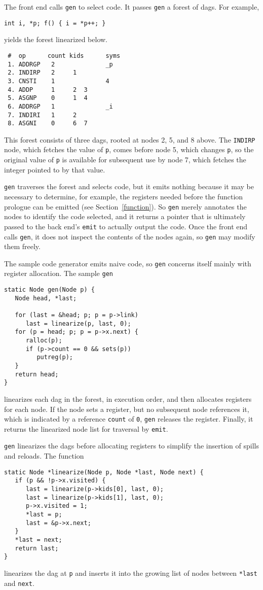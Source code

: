 \label{gen}
\label{dags:registers}
The front end calls \verb|gen| to select code.  It passes \verb|gen| a
forest of dags.  For example,
\begin{verbatim}
int i, *p; f() { i = *p++; }
\end{verbatim}
yields the forest linearized below.
\begin{verbatim}
 #  op      count kids      syms
 1. ADDRGP   2              _p
 2. INDIRP   2     1
 3. CNSTI    1              4
 4. ADDP     1     2  3
 5. ASGNP    0     1  4
 6. ADDRGP   1              _i
 7. INDIRI   1     2
 8. ASGNI    0     6  7
\end{verbatim}
This forest consists of three dags, rooted at nodes 2, 5, and 8 above.
The \verb|INDIRP| node, which fetches the value of \verb|p|, comes
before node 5, which changes \verb|p|, so the original value of
\verb|p| is available for subsequent use by node 7, which fetches the
integer pointed to by that value.

\verb|gen| traverses the forest and selects code, but it
emits nothing because it may be necessary to determine, for example,
the registers needed before the function prologue
can be emitted (see Section~\ref{function}).
So \verb|gen| merely annotates the nodes to identify the code selected,
and it returns a pointer that is ultimately passed to the back end's
\verb|emit| to actually output the code.  Once the front end calls
\verb|gen|, it does not inspect the contents of the nodes again, so
\verb|gen| may modify them freely.

The sample code generator emits naive code, so \verb|gen| concerns
itself mainly with register allocation. 
The sample \verb|gen|
\begin{verbatim}
static Node gen(Node p) {
   Node head, *last;

   for (last = &head; p; p = p->link)
      last = linearize(p, last, 0);
   for (p = head; p; p = p->x.next) {
      ralloc(p);
      if (p->count == 0 && sets(p))
         putreg(p);
   }
   return head;
}
\end{verbatim}
linearizes each dag in the forest, in execution order, and then
allocates registers for each node.  If the node sets a register, but no
subsequent node references it, which is indicated by a reference
\verb|count| of \verb|0|, \verb|gen| releases the register.  Finally,
it returns the linearized node list for traversal by \verb|emit|.

\verb|gen| linearizes the dags before allocating registers to simplify
the insertion of spills and reloads. The function
\begin{verbatim}
static Node *linearize(Node p, Node *last, Node next) {
   if (p && !p->x.visited) {
      last = linearize(p->kids[0], last, 0);
      last = linearize(p->kids[1], last, 0);
      p->x.visited = 1;
      *last = p;
      last = &p->x.next;
   }
   *last = next;
   return last;
}
\end{verbatim}
linearizes the dag at \verb|p| and inserts it into the growing list of
nodes between \verb|*last| and \verb|next|.

